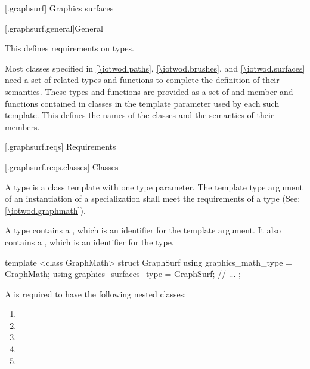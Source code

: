 
 [\iotwod.graphsurf] {Graphics surfaces}

 [\iotwod.graphsurf.general]{General}

\pnum
This \clause defines requirements on \term{\graphicssurfacestemplparamnospace} types.

\pnum
Most classes specified in \clause \ref{\iotwod.paths}, \clause \ref{\iotwod.brushes}, and \clause \ref{\iotwod.surfaces} need a set of related types and functions to complete the definition of their semantics. These types and functions are provided as a set of  and member  and functions contained in classes in the template parameter \tcode{\graphicssurfacestemplparamnospace} used by each such template. This \clause defines the names of the classes and the semantics of their members.

 [\iotwod.graphsurf.reqs] {Requirements}

 [\iotwod.graphsurf.reqs.classes] {Classes}

\pnum
A \graphicssurfacestemplparam type is a class template with one type parameter. The template type argument of an instantiation of a \graphicssurfacestemplparam specialization shall meet the requirements of a \graphicsmathtemplparam type (See: \ref{\iotwod.graphmath}).

\pnum
A \graphicssurfacestemplparam type contains a  , which is an identifier for the template argument. It also contains a  , which is an identifier for the \graphicssurfacestemplparam type.

\pnum
\begin{example}
\begin{codeblock}
template <class GraphMath>
struct GraphSurf {
  using graphics_math_type = GraphMath;
  using graphics_surfaces_type = GraphSurf;
  // ...
};
\end{codeblock}
\end{example}

\pnum
A \graphicssurfacestemplparam is required to have the following  nested classes:

\begin{enumerate}
\item {}
\item {}
\item {}
\item {}
\item {}
\end{enumerate}

